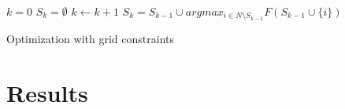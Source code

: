 \documentclass[conference]{IEEEtran}
\begin{document}
\begin{algorithm}
	\begin{algorithmic}
				\State $k=0$
				\State $S_k = \emptyset $
                	\State $k \gets k+1$
                	\State $ S_k = S_{k-1} \cup argmax_{i \in N \setminus S_{k-1} } F(S_{k-1} \cup \{i\}) $
                \EndWhile
     \end{algorithmic}
     \caption{Optimization with grid constraints}
        \label{algo_1}
\end{algorithm}

%                                              
\normalsize



\section{Results}
\label{sec:Results}
\end{document}

